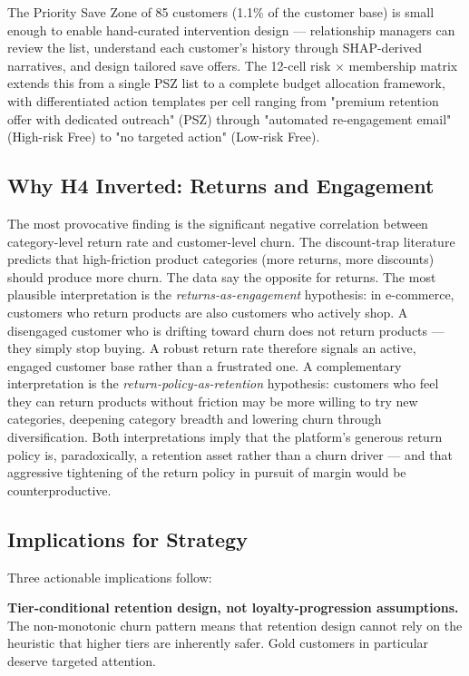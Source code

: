 \documentclass[conference]{IEEEtran}
\begin{document}
The Priority Save Zone of 85 customers (1.1\% of the customer base) is small enough to enable hand-curated intervention design — relationship managers can review the list, understand each customer's history through SHAP-derived narratives, and design tailored save offers. The 12-cell risk $\times$ membership matrix extends this from a single PSZ list to a complete budget allocation framework, with differentiated action templates per cell ranging from "premium retention offer with dedicated outreach" (PSZ) through "automated re-engagement email" (High-risk Free) to "no targeted action" (Low-risk Free).

\subsection{Why H4 Inverted: Returns and Engagement}

The most provocative finding is the significant negative correlation between category-level return rate and customer-level churn. The discount-trap literature predicts that high-friction product categories (more returns, more discounts) should produce more churn. The data say the opposite for returns. The most plausible interpretation is the \emph{returns-as-engagement} hypothesis: in e-commerce, customers who return products are also customers who actively shop. A disengaged customer who is drifting toward churn does not return products — they simply stop buying. A robust return rate therefore signals an active, engaged customer base rather than a frustrated one. A complementary interpretation is the \emph{return-policy-as-retention} hypothesis: customers who feel they can return products without friction may be more willing to try new categories, deepening category breadth and lowering churn through diversification. Both interpretations imply that the platform's generous return policy is, paradoxically, a retention asset rather than a churn driver — and that aggressive tightening of the return policy in pursuit of margin would be counterproductive.

\subsection{Implications for Strategy}

Three actionable implications follow:

\textbf{Tier-conditional retention design, not loyalty-progression assumptions.} The non-monotonic churn pattern means that retention design cannot rely on the heuristic that higher tiers are inherently safer. Gold customers in particular deserve targeted attention.
\end{document}
